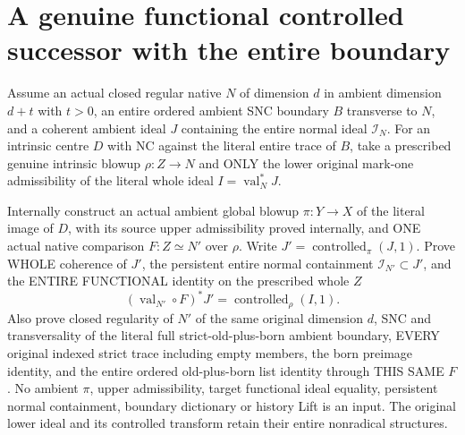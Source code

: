 \section{A genuine functional controlled successor with the entire boundary}

\begin{theorem}
\label{hir:disjoint-functional-controlled-successor}
\leanok
Assume an actual closed regular native $N$ of dimension $d$ in ambient
dimension $d+t$ with $t>0$, an entire ordered ambient SNC boundary $B$
transverse to $N$, and a coherent ambient ideal $J$ containing the entire
normal ideal $\mathcal I_N$. For an intrinsic centre $D$ with NC against the
literal entire trace of $B$, take a prescribed genuine intrinsic blowup
$\rho:Z\to N$ and ONLY the lower original mark-one admissibility of the
literal whole ideal $I=\operatorname{val}_N^*J$.

Internally construct an actual ambient global blowup $\pi:Y\to X$ of the
literal image of $D$, with its source upper admissibility proved internally,
and ONE actual native comparison $F:Z\simeq N'$ over $\rho$. Write
$J'=\operatorname{controlled}_{\pi}(J,1)$. Prove WHOLE coherence of $J'$, the
persistent entire normal containment $\mathcal I_{N'}\subset J'$, and the
ENTIRE FUNCTIONAL identity on the prescribed whole $Z$
\[
 (\operatorname{val}_{N'}\circ F)^*J'
    =\operatorname{controlled}_{\rho}(I,1).
\]
Also prove closed regularity of $N'$ of the same original dimension $d$,
SNC and transversality of the literal full strict-old-plus-born ambient
boundary, EVERY original indexed strict trace including empty members,
the born preimage identity, and the entire ordered old-plus-born list
identity through THIS SAME $F$. No ambient $\pi$, upper admissibility,
target functional ideal equality, persistent normal containment, boundary
dictionary or history Lift is an input. The original lower ideal and its
controlled transform retain their entire nonradical structures.
\end{theorem}
